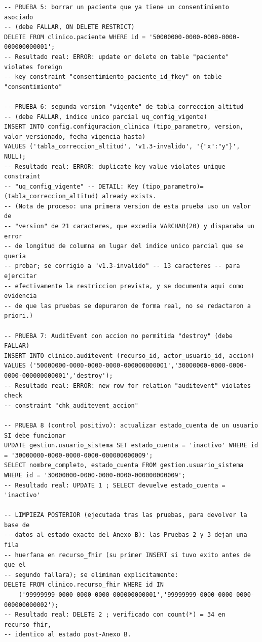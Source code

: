 \documentclass[11pt,a4paper]{article}
\begin{document}
\begin{samepage}
\begin{verbatim}
-- PRUEBA 5: borrar un paciente que ya tiene un consentimiento asociado
-- (debe FALLAR, ON DELETE RESTRICT)
DELETE FROM clinico.paciente WHERE id = '50000000-0000-0000-0000-000000000001';
-- Resultado real: ERROR: update or delete on table "paciente" violates foreign
-- key constraint "consentimiento_paciente_id_fkey" on table "consentimiento"

-- PRUEBA 6: segunda version "vigente" de tabla_correccion_altitud
-- (debe FALLAR, indice unico parcial uq_config_vigente)
INSERT INTO config.configuracion_clinica (tipo_parametro, version, valor_versionado, fecha_vigencia_hasta)
VALUES ('tabla_correccion_altitud', 'v1.3-invalido', '{"x":"y"}', NULL);
-- Resultado real: ERROR: duplicate key value violates unique constraint
-- "uq_config_vigente" -- DETAIL: Key (tipo_parametro)=(tabla_correccion_altitud) already exists.
-- (Nota de proceso: una primera version de esta prueba uso un valor de
-- "version" de 21 caracteres, que excedia VARCHAR(20) y disparaba un error
-- de longitud de columna en lugar del indice unico parcial que se queria
-- probar; se corrigio a "v1.3-invalido" -- 13 caracteres -- para ejercitar
-- efectivamente la restriccion prevista, y se documenta aqui como evidencia
-- de que las pruebas se depuraron de forma real, no se redactaron a priori.)

-- PRUEBA 7: AuditEvent con accion no permitida "destroy" (debe FALLAR)
INSERT INTO clinico.auditevent (recurso_id, actor_usuario_id, accion)
VALUES ('50000000-0000-0000-0000-000000000001','30000000-0000-0000-0000-000000000001','destroy');
-- Resultado real: ERROR: new row for relation "auditevent" violates check
-- constraint "chk_auditevent_accion"

-- PRUEBA 8 (control positivo): actualizar estado_cuenta de un usuario SI debe funcionar
UPDATE gestion.usuario_sistema SET estado_cuenta = 'inactivo' WHERE id = '30000000-0000-0000-0000-000000000009';
SELECT nombre_completo, estado_cuenta FROM gestion.usuario_sistema WHERE id = '30000000-0000-0000-0000-000000000009';
-- Resultado real: UPDATE 1 ; SELECT devuelve estado_cuenta = 'inactivo'

-- LIMPIEZA POSTERIOR (ejecutada tras las pruebas, para devolver la base de
-- datos al estado exacto del Anexo B): las Pruebas 2 y 3 dejan una fila
-- huerfana en recurso_fhir (su primer INSERT si tuvo exito antes de que el
-- segundo fallara); se eliminan explicitamente:
DELETE FROM clinico.recurso_fhir WHERE id IN
    ('99999999-0000-0000-0000-000000000001','99999999-0000-0000-0000-000000000002');
-- Resultado real: DELETE 2 ; verificado con count(*) = 34 en recurso_fhir,
-- identico al estado post-Anexo B.
\end{verbatim}\end{samepage}
\end{document}
